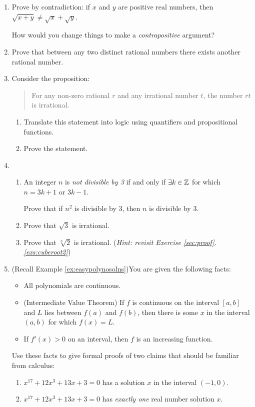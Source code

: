 \begin{exercises}{}{}
\begin{enumerate}
	  
		\item Prove by contradiction: if $x$ and $y$ are positive real numbers, then $\sqrt{x+y}\neq\sqrt{x}+\sqrt{y}$.\par
		How would you change things to make a \emph{contrapositive} argument?
	
	  
		\item Prove that between any two distinct rational numbers there exists another rational number.\label{ex:rationalsdenseinthemselves}
		
	
		\item Consider the proposition:
	  \begin{quote}
	      For any non-zero rational $r$ and any irrational number $t$, the number $rt$ is irrational.
	  \end{quote}
	  \begin{enumerate}
	      \item Translate this statement into logic using quantifiers and propositional functions.
	      \item Prove the statement.
	  \end{enumerate}
	
		
		\item\begin{enumerate}
		  \item An integer $n$ is \emph{not divisible by 3} if and only if $\exists k\in\mathbb{Z}$ for which $n=3k+1$ or $3k-1$.\par
		  Prove that if $n^2$ is divisible by 3, then $n$ is divisible by 3.
		  \item Prove that $\sqrt 3$ is irrational.
		  \item Prove that $\sqrt[3]{2}$ is irrational. (\emph{Hint: revisit Exercise \ref*{sec:proof}.\ref{exs:cuberoot2}}) 
		\end{enumerate}
	

	  \item (Recall Example \ref{ex:easypolynosolns})\lstsp You are given the following facts:
	  \begin{itemize}
	    \item All polynomials are continuous.
	    \item (Intermediate Value Theorem) If $f$ is continuous on the interval $[a,b]$ and $L$ lies between $f(a)$ and $f(b)$, then there is some $x$ in the interval $(a,b)$ for which $f(x)=L$.
	    \item If $f'(x)>0$ on an interval, then $f$ is an increasing function.
		\end{itemize}
		Use these facts to give formal proofs of two claims that should be familiar from calculus:
		\begin{enumerate}
		  \item $x^{17}+12x^3+13x+3=0$ has a solution $x$ in the interval $(-1,0)$.
		  \item $x^{17}+12x^3+13x+3=0$ has \emph{exactly one} real number solution $x$.
		\end{enumerate}
	

\end{enumerate}
\end{exercises}
